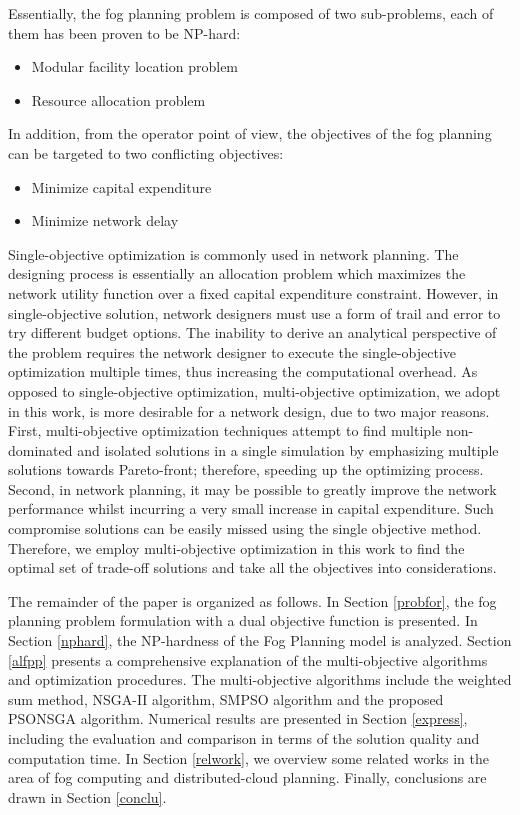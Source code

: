 \documentclass[10pt,journal,compsoc]{IEEEtran}
\begin{document}
Essentially, the fog planning problem is composed of two sub-problems, each of them has been proven to be NP-hard:
\begin{itemize}
\item Modular facility location problem %
\item Resource allocation problem %
\end{itemize}
In addition, from the operator point of view, the objectives of the fog planning can be targeted to two conflicting objectives:
\begin{itemize}
\item Minimize capital expenditure
\item Minimize network delay
\end{itemize}

Single-objective optimization is commonly used in network planning. The designing process is essentially an allocation problem which maximizes the network utility function over a fixed capital expenditure constraint. 
However, in single-objective solution, network designers must use a form of trail and error to try different budget options. The inability to derive an analytical perspective of the problem requires the network designer to execute the single-objective optimization multiple times, thus increasing the computational overhead. 
As opposed to single-objective optimization, multi-objective optimization, we adopt in this work, is more desirable for a network design, due to two major reasons. First, multi-objective optimization techniques attempt to find multiple non-dominated and isolated solutions in a single simulation by emphasizing multiple solutions towards Pareto-front; therefore, speeding up the optimizing process. 
Second, in network planning, it may be possible to greatly improve the network performance whilst incurring a very small increase in capital expenditure. Such compromise solutions can be easily missed using the single objective method. Therefore, we employ multi-objective optimization in this work to find the optimal set of trade-off solutions and take all the objectives into considerations.

The remainder of the paper is organized as follows. In Section \ref{probfor}, the fog planning problem formulation with a dual objective function is presented. In Section \ref{nphard}, the NP-hardness of the Fog Planning model is analyzed. Section \ref{alfpp} presents a comprehensive explanation of the multi-objective algorithms and optimization procedures. The multi-objective algorithms include the weighted sum method, NSGA-II algorithm, SMPSO algorithm and the proposed PSONSGA algorithm. Numerical results are presented in Section \ref{express}, including the evaluation and comparison in terms of the solution quality and computation time. In Section \ref{relwork}, we overview some related works in the area of fog computing and distributed-cloud planning. Finally, conclusions are drawn in Section \ref{conclu}.
\end{document}

